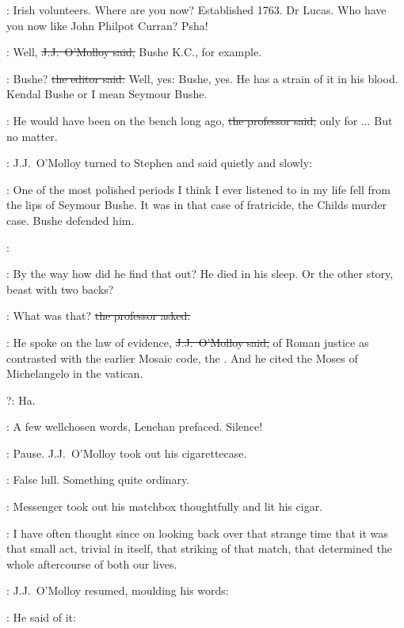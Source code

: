 \crawford:
Irish volunteers.
Where are you now?
Established 1763.
Dr Lucas.
Who have you now like John Philpot Curran?
Psha!

\jjom:
Well,
\sout{J.J.~O'Molloy said,}
Bushe K.C., for example.

\crawford:
Bushe?
\sout{the editor said.}
Well, yes:
Bushe, yes.
He has a strain of it in his blood.
Kendal Bushe or I mean Seymour Bushe.

\machugh:
He would have been on the bench long ago,
\sout{the professor said,}
only for ...
But no matter.

:
J.J.~O'Molloy turned to Stephen
and said quietly and slowly:

\jjom:
One of the most polished periods
I think I ever listened to in my life
fell from the lips of Seymour Bushe.
It was in that case of fratricide,
the Childs murder case.
Bushe defended him.

\StephenInt:

\StephenInt:
By the way how did he find that out?
He died in his sleep.
Or the other story,
beast with two backs?

\machugh:
What was that?
\sout{the professor asked.}



\jjom:
He spoke on the law of evidence,
\sout{J.J.~O'Molloy said,}
of Roman justice
as contrasted with the earlier Mosaic code,
the .
And he cited the Moses of Michelangelo in the vatican.

\crawford?:
Ha.

\lenehan:
A few wellchosen words,
Lenehan prefaced.
Silence!

:
Pause.
J.J.~O'Molloy took out his cigarettecase.

\StephenInt:
False lull.
Something quite ordinary.

\StephenInt:
Messenger took out his matchbox thoughtfully and lit his cigar.

\StephenInt:
I have often thought since
on looking back over that strange time
that it was that small act,
trivial in itself,
that striking of that match,
that determined the whole aftercourse of both our lives.



:
J.J.~O'Molloy resumed,
moulding his words:

\jjom:
He said of it:
\stage{[Bushe]}

